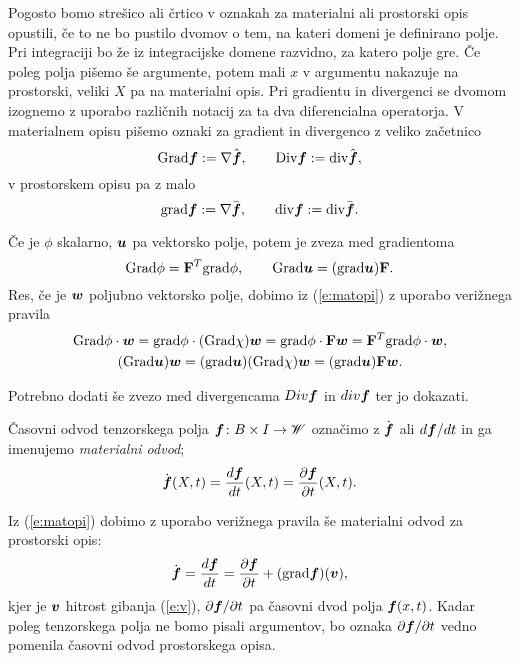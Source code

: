 Pogosto bomo strešico ali črtico v oznakah za materialni ali prostorski opis opustili,
če to ne bo pustilo dvomov o tem, na kateri domeni je definirano polje.
Pri integraciji bo že iz integracijske domene razvidno, za katero polje gre.
Če poleg polja pišemo še argumente, potem mali $x$ v argumentu nakazuje na prostorski,
veliki $X$ pa na materialni opis.
Pri gradientu in divergenci se dvomom izognemo z uporabo različnih notacij
za ta dva diferencialna operatorja.
V materialnem opisu pišemo oznaki za gradient in divergenco z veliko začetnico
\[ \mathrm{Grad}\boldsymbol f:=\nabla\hat{\boldsymbol f},\qquad \mathrm {Div}\boldsymbol f:=\mathrm{div}\hat{\boldsymbol f}, \]
v prostorskem opisu pa z malo
\[ \mathrm{grad}\boldsymbol f:=\nabla\bar{\boldsymbol f},\qquad \mathrm{div}\boldsymbol f:=\mathrm{div}\bar{\boldsymbol f}. \]

Če je $\phi$ skalarno, $\boldsymbol u$ pa vektorsko polje, potem je zveza med gradientoma
\begin{equation}\label{e:gz}
	\mathrm{Grad}\phi=\mathbf F^{T}\mathrm{grad}\phi,\qquad \mathrm{Grad}\boldsymbol u=(\mathrm{grad}\boldsymbol u)\mathbf F.
\end{equation}
Res, če je $\boldsymbol w$ poljubno vektorsko polje, dobimo iz (\ref{e:matopi})
z uporabo verižnega pravila
\begin{gather*}
	\mathrm{Grad}\phi\cdot\boldsymbol w=\mathrm{grad}\phi\cdot(\mathrm{Grad}\chi)\boldsymbol w=
	\mathrm{grad}\phi\cdot \mathbf F\boldsymbol w=\mathbf F^{T}\mathrm{grad}\phi\cdot\boldsymbol w, \\
	(\mathrm{Grad}\boldsymbol u)\boldsymbol w=(\mathrm{grad}\boldsymbol u)(\mathrm{Grad}\chi)\boldsymbol w
	=(\mathrm{grad}\boldsymbol u)\mathbf F\boldsymbol w.
\end{gather*}

\textcolor[rgb]{1,0,0}{Potrebno dodati še zvezo med divergencama $Div\boldsymbol f$ in $div\boldsymbol f$ ter jo dokazati.}

\begin{definicija}
	Časovni odvod tenzorskega polja $\boldsymbol f\colon B\times I\to\mathscr W$ označimo z
	$\dot{\boldsymbol f}$ ali $d\boldsymbol f/dt$ in ga imenujemo \emph{materialni odvod};
	\[ \dot{\boldsymbol f}(X,t)=\frac{d\boldsymbol f}{dt}(X,t)=\frac{\partial\boldsymbol f}{\partial t}(X,t). \]
\end{definicija}
Iz (\ref{e:matopi}) dobimo z uporabo verižnega pravila še materialni odvod za prostorski opis:
\begin{equation} \label{e:matodv}
	\dot{\boldsymbol f}=\frac{d\boldsymbol f}{dt}=
	\frac{\partial\boldsymbol f}{\partial t}+(\mathrm{grad}\boldsymbol f)(\boldsymbol v),
\end{equation}
kjer je $\boldsymbol v$ hitrost gibanja (\ref{e:v}), $\partial\boldsymbol f/\partial t$ pa
časovni dvod polja $\boldsymbol f(x,t)$. Kadar poleg tenzorskega polja ne bomo pisali argumentov,
bo oznaka $\partial\boldsymbol f/\partial t$ vedno pomenila časovni odvod prostorskega opisa.


